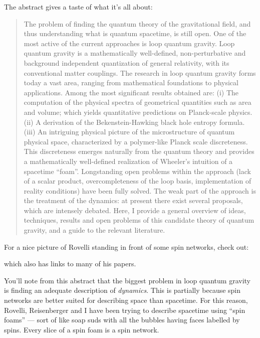 \documentclass{article}
\def\tightlist{}
\renewcommand{\texttt}[1]{%
  \begingroup
  \ttfamily
  \begingroup\lccode`~=`/\lowercase{\endgroup\def~}{/\discretionary{}{}{}}%
  \begingroup\lccode`~=`[\lowercase{\endgroup\def~}{[\discretionary{}{}{}}%
  \begingroup\lccode`~=`.\lowercase{\endgroup\def~}{.\discretionary{}{}{}}%
  \catcode`/=\active\catcode`[=\active\catcode`.=\active
  \scantokens{#1\noexpand}%
  \endgroup
}
\begin{document}
The abstract gives a taste of what it's all about:

\begin{quote}
The problem of finding the quantum theory of the gravitational field,
and thus understanding what is quantum spacetime, is still open. One of
the most active of the current approaches is loop quantum gravity. Loop
quantum gravity is a mathematically well-defined, non-perturbative and
background independent quantization of general relativity, with its
conventional matter couplings. The research in loop quantum gravity
forms today a vast area, ranging from mathematical foundations to
physical applications. Among the most significant results obtained are:
(i) The computation of the physical spectra of geometrical quantities
such as area and volume; which yields quantitative predictions on
Planck-scale physics. (ii) A derivation of the Bekenstein-Hawking black
hole entropy formula. (iii) An intriguing physical picture of the
microstructure of quantum physical space, characterized by a
polymer-like Planck scale discreteness. This discreteness emerges
naturally from the quantum theory and provides a mathematically
well-defined realization of Wheeler's intuition of a spacetime ``foam''.
Longstanding open problems within the approach (lack of a scalar
product, overcompleteness of the loop basis, implementation of reality
conditions) have been fully solved. The weak part of the approach is the
treatment of the dynamics: at present there exist several proposals,
which are intensely debated. Here, I provide a general overview of
ideas, techniques, results and open problems of this candidate theory of
quantum gravity, and a guide to the relevant literature.
\end{quote}

For a nice picture of Rovelli standing in front of some spin networks,
check out:


which also has links to many of his papers.

You'll note from this abstract that the biggest problem in loop quantum
gravity is finding an adequate description of \emph{dynamics}. This is
partially because spin networks are better suited for describing space
than spacetime. For this reason, Rovelli, Reisenberger and I have been
trying to describe spacetime using ``spin foams'' --- sort of like soap
suds with all the bubbles having faces labelled by spins. Every slice of
a spin foam is a spin network.
\end{document}
